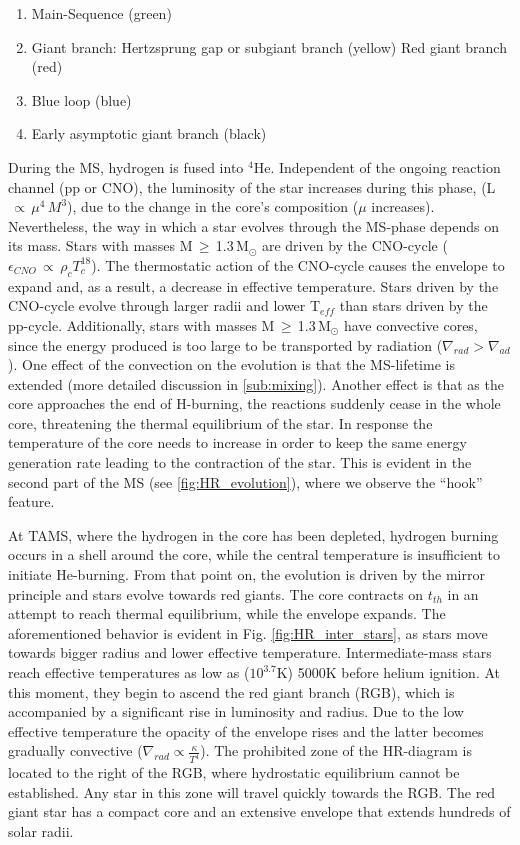 \begin{enumerate}
    \item Main-Sequence (green)
    \item Giant branch: 
        \subitem Hertzsprung gap or subgiant branch (yellow) 
        \subitem Red giant branch (red)
    \item Blue loop (blue)
    \item Early asymptotic giant branch (black)
\end{enumerate}
During the MS, hydrogen is fused into $^4$He. Independent of the ongoing reaction channel (pp or CNO), the luminosity of the star increases during this phase, (L$\,\propto\,\mu^{4}\,M^3$), due to the change in the core's composition ($\mu$ increases). Nevertheless, the way in which a star evolves through the MS-phase depends on its mass. Stars with masses M\,$\geq$\,1.3\,M$_\odot$ are driven by the CNO-cycle ($\epsilon_{CNO}\,\propto\,\rho_{c}T^{18}_{c}$). The thermostatic action of the CNO-cycle causes the envelope to expand and, as a result, a decrease in effective temperature. Stars driven by the CNO-cycle evolve through larger radii and lower T$_{eff}$ than stars driven by the pp-cycle. Additionally, stars with masses M\,$\geq$\,1.3\,M$_\odot$ have convective cores, since the energy produced is too large to be transported by radiation ($\nabla_{rad} > \nabla_{ad}$). One effect of the convection on the evolution is that the MS-lifetime is extended (more detailed discussion in \cref{sub:mixing}). Another effect is that as the core approaches the end of H-burning, the reactions suddenly cease in the whole core, threatening the thermal equilibrium of the star. In response the temperature of the core needs to increase in order to keep the same energy generation rate leading to the contraction of the star. This is evident in the second part of the MS (see \cref{fig:HR_evolution}), where we observe the ``hook'' feature. 

At TAMS, where the hydrogen in the core has been depleted, hydrogen burning occurs in a shell around the core, while the central temperature is insufficient to initiate He-burning. From that point on, the evolution is driven by the mirror principle and stars evolve towards red giants. The core contracts on $t_{th}$ in an attempt to reach thermal equilibrium, while the envelope expands. The aforementioned behavior is evident in Fig. \ref{fig:HR_inter_stars}, as stars move towards bigger radius and lower effective temperature. Intermediate-mass stars reach effective temperatures as low as ($10^{3.7}$K) 5000K before helium ignition. At this moment, they begin to ascend the red giant branch (RGB), which is accompanied by a significant rise in luminosity and radius. Due to the low effective temperature the opacity of the envelope rises and the latter becomes gradually convective ($\nabla_{rad} \propto \frac{\kappa}{T^4}$). The prohibited zone of the HR-diagram is located to the right of the RGB, where hydrostatic equilibrium cannot be established. Any star in this zone will travel quickly towards the RGB. The red giant star has a compact core and an extensive envelope that extends hundreds of solar radii. 

